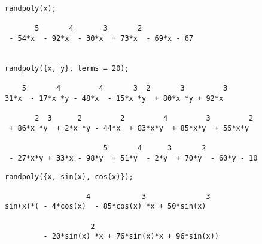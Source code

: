 \begin{verbatim}
randpoly(x);

       5       4       3       2
 - 54*x  - 92*x  - 30*x  + 73*x  - 69*x - 67


randpoly({x, y}, terms = 20);

    5       4         4       3  2       3         3
31*x  - 17*x *y - 48*x  - 15*x *y  + 80*x *y + 92*x

       2  3      2         2         4         3         2
 + 86*x *y  + 2*x *y - 44*x  + 83*x*y  + 85*x*y  + 55*x*y

                       5       4      3       2
 - 27*x*y + 33*x - 98*y  + 51*y  - 2*y  + 70*y  - 60*y - 10
\end{verbatim}
\newpage
\begin{verbatim}
randpoly({x, sin(x), cos(x)});

                   4            3              3
sin(x)*( - 4*cos(x)  - 85*cos(x) *x + 50*sin(x)

                    2
         - 20*sin(x) *x + 76*sin(x)*x + 96*sin(x))
\end{verbatim}

